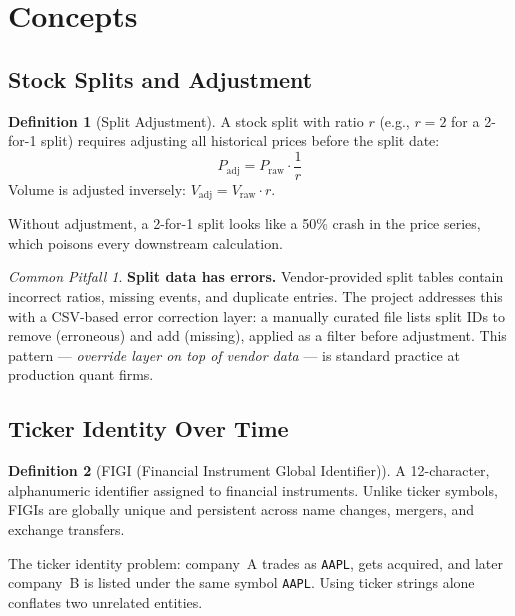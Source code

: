 \documentclass[a4paper, 11pt]{report}
\theoremstyle{definition}
\newtheorem{definition}{Definition}[chapter]
\theoremstyle{remark}
\newtheorem{pitfall}{Common Pitfall}[chapter]
\begin{document}
\section{Concepts}

\subsection{Stock Splits and Adjustment}

\begin{definition}[Split Adjustment]
    A stock split with ratio $r$ (e.g., $r = 2$ for a 2-for-1 split) requires
    adjusting all historical prices before the split date:
    \[
        P_{\text{adj}} = P_{\text{raw}} \cdot \frac{1}{r}
    \]
    Volume is adjusted inversely: $V_{\text{adj}} = V_{\text{raw}} \cdot r$.

    Without adjustment, a 2-for-1 split looks like a 50\% crash in the price
    series, which poisons every downstream calculation.
\end{definition}

\begin{pitfall}
    \textbf{Split data has errors.}  Vendor-provided split tables contain
    incorrect ratios, missing events, and duplicate entries.  The project
    addresses this with a CSV-based error correction layer: a manually curated
    file lists split IDs to remove (erroneous) and add (missing), applied as a
    filter before adjustment.  This pattern --- \emph{override layer on top of
    vendor data} --- is standard practice at production quant firms.
\end{pitfall}

\subsection{Ticker Identity Over Time}

\begin{definition}[FIGI (Financial Instrument Global Identifier)]
    A 12-character, alphanumeric identifier assigned to financial instruments.
    Unlike ticker symbols, FIGIs are globally unique and persistent across name
    changes, mergers, and exchange transfers.
\end{definition}

The ticker identity problem: company~A trades as \texttt{AAPL}, gets acquired,
and later company~B is listed under the same symbol \texttt{AAPL}.  Using ticker
strings alone conflates two unrelated entities.
\end{document}
